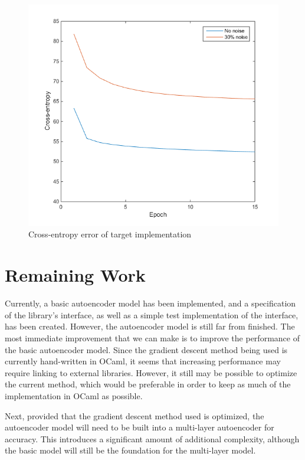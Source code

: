 \documentclass{sig-alternate}
\begin{document}
\begin{figure}[h]
	\begin{center}
		\includegraphics[width=1\linewidth]{error.png}
	\end{center}
	\vspace{-12pt}
	\caption{Cross-entropy error of target implementation}
	\label{fig:performance}
\end{figure}

\section{Remaining Work}
\label{sec:project_proposal}

Currently, a basic autoencoder model has been implemented, and a specification of the library's
interface, as well as a simple test implementation of the interface, has been created. 
However, the autoencoder model is still far from finished. The most immediate improvement
that we can make is to improve the performance of the basic autoencoder model. Since the gradient
descent method being used is currently hand-written in OCaml, it seems that increasing 
performance may require linking to external libraries. However, it still may be possible to
optimize the current method, which would be preferable in order to keep as much of the 
implementation in OCaml as possible.

Next, provided that the gradient descent method used is optimized, the autoencoder model will 
need to be built into a multi-layer autoencoder for accuracy. This introduces a significant
amount of additional complexity, although the basic model will still be the foundation for
the multi-layer model. 
\end{document}
